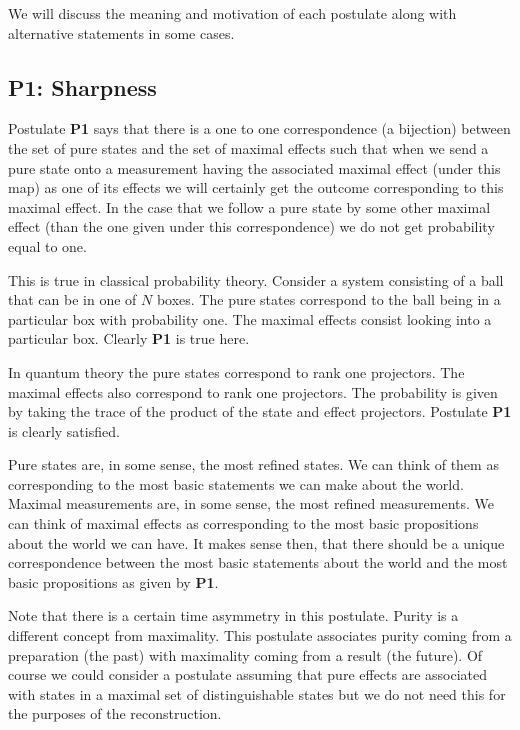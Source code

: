 \documentclass[10pt]{article}
\begin{document}
We will discuss the meaning and motivation of each postulate along with alternative statements in some cases.


\subsection{{\bf P1}: Sharpness}

Postulate {\bf P1} says that there is a one to one correspondence (a bijection) between the set of pure states and the set of maximal effects such that when we send a pure state onto a measurement having the associated maximal effect (under this map) as one of its effects we will certainly get the outcome corresponding to this maximal effect.  In the case that we follow a pure state by some other maximal effect (than the one given under this correspondence) we do not get probability equal to one.

This is true in classical probability theory.  Consider a system consisting of a ball that can be in one of $N$ boxes.  The pure states correspond to the ball being in a particular box with probability one.  The maximal effects consist looking into a particular box.  Clearly {\bf P1} is true here.

In quantum theory the pure states correspond to rank one projectors.  The maximal effects also correspond to rank one projectors.  The probability is given by taking the trace of the product of the state and effect projectors.  Postulate {\bf P1} is clearly satisfied.

Pure states are, in some sense, the most refined states.  We can think of them as corresponding to the most basic statements we can make about the world.  Maximal measurements are, in some sense, the most refined measurements.  We can think of maximal effects as corresponding to the most basic propositions about the world we can have.  It makes sense then, that there should be a unique correspondence between the most basic statements about the world and the most basic propositions as given by {\bf P1}.

Note that there is a certain time asymmetry in this postulate. Purity is a different concept from maximality.  This postulate associates purity coming from a preparation (the past) with maximality coming from a result (the future).  Of course we could consider a postulate assuming that pure effects are associated with states in a maximal set of distinguishable states but we do not need this for the purposes of the reconstruction.
\end{document}
